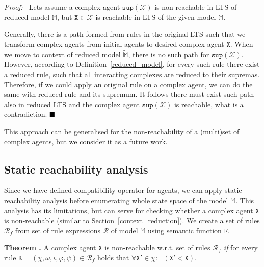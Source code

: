 \documentclass[12pt]{fithesis2}
\newcounter{counter}[section]
\renewcommand{\thecounter}{\thesection.\arabic{counter}}
\newenvironment{proof}{\noindent\textit{Proof:~ }\nopagebreak}{\bigskip}
\newenvironment{theorem}{\bigskip\refstepcounter{counter}\noindent\textbf{Theorem \thecounter }\nopagebreak}{\bigskip}
\newcommand*{\QEDA}{\hfill\ensuremath{\blacksquare}}%
\begin{document}
\begin{proof}
Lets assume a complex agent $\mathtt{sup}(\mathscr{X})$ is non-reachable in LTS of reduced model $\widetilde{\mathds{M}}$, but $\mathtt{X} \in \mathscr{X}$ is reachable in LTS of the given model $\mathds{M}$.

Generally, there is a path formed from rules in the original LTS such that we transform complex agents from initial agents to desired complex agent $\mathtt{X}$. When we move to context of reduced model $\widetilde{\mathds{M}}$, there is no such path for $\mathtt{sup}(\mathscr{X})$. However, according to Definition~\ref{reduced_model}, for every such rule there exist a reduced rule, such that all interacting complexes are reduced to their supremas. Therefore, if we could apply an original rule on a complex agent, we can do the same with reduced rule and its supremum. It follows there must exist such path also in reduced LTS and the complex agent $\mathtt{sup}(\mathscr{X})$ is reachable, what is a contradiction. $\QEDA$
\end{proof}

This approach can be generalised for the non-reachability of a (multi)set of complex agents, but we consider it as a future work.

\subsection{Static reachability analysis}
\label{static_reachability_analysis}

Since we have defined compatibility operator for agents, we can apply static reachability analysis before enumerating whole state space of the model $\mathds{M}$. This analysis has its limitations, but can serve for checking whether a complex agent $\mathtt{X}$ is non-reachable (similar to Section~\ref{context_reduction}). We create a set of rules $\mathcal{R}_f$ from set of rule expressions $\mathcal{R}$ of model $\mathds{M}$ using semantic function $\mathtt{F}$.

\begin{theorem}
\label{static_reach}
A complex agent $\mathtt{X}$ is non-reachable w.r.t. set of rules $\mathcal{R}_f$ \emph{if} for every rule $\mathtt{R} = (\chi, \omega, \iota, \varphi, \psi) \in \mathcal{R}_f$ holds that $\forall \mathtt{X}' \in \chi: \neg (\mathtt{X}' \lhd \mathtt{X})$.
\end{theorem}
\end{document}
